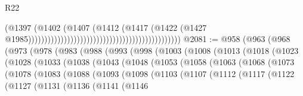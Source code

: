 \begin{lexlean}{R22}
\begin{coremodule}
                                                                                    (@1397
                                                                                      (@1402
                                                                                        (@1407
                                                                                          (@1412
                                                                                            (@1417
                                                                                              (@1422
                                                                                                (@1427
                                                                                                  @1985)))))))))))))))))))))))))))))))))))))))))))))))
@2081 := @958
    (@963
      (@968
        (@973
          (@978
            (@983
              (@988
                (@993
                  (@998
                    (@1003
                      (@1008
                        (@1013
                          (@1018
                            (@1023
                              (@1028
                                (@1033
                                  (@1038
                                    (@1043
                                      (@1048
                                        (@1053
                                          (@1058
                                            (@1063
                                              (@1068
                                                (@1073
                                                  (@1078
                                                    (@1083
                                                      (@1088
                                                        (@1093
                                                          (@1098
                                                            (@1103
                                                              (@1107
                                                                (@1112
                                                                  (@1117
                                                                    (@1122
                                                                      (@1127
                                                                        (@1131
                                                                          (@1136
                                                                            (@1141
                                                                              (@1146

\end{coremodule}
\end{lexlean}
